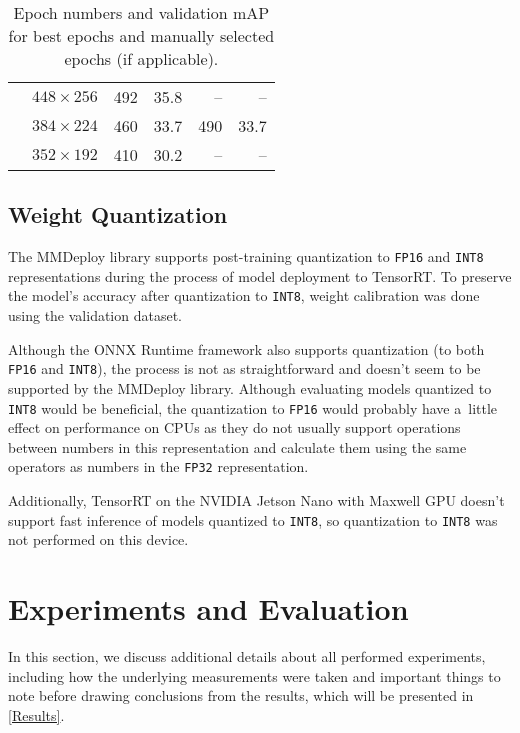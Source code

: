 \begin{table}[t]
\begin{threeparttable}
\begin{tabular}{|c|c|rr|rr|}
                                        & $448\times256$  & 492 & 35.8 &     -- & -- \\
            \cline{2-6}
                                        & $384\times224$  & 460 & 33.7 & 490 & 33.7 \\
            \cline{2-6}
                                        & $352\times192$  & 410 & 30.2 &     -- & -- \\
            \hline
        \end{tabular}
        \caption{Epoch numbers and validation mAP for best epochs and manually
        selected epochs (if applicable).}
        \label{CheckpointsUsed}
    \end{threeparttable}
    \normalsize
\end{table}


\subsection*{Weight Quantization}

The MMDeploy library supports post-training quantization to \texttt{FP16} and
\texttt{INT8} representations during the process of model deployment to
TensorRT. To preserve the model's accuracy after quantization to \texttt{INT8},
weight calibration was done using the validation dataset.

Although the ONNX Runtime framework also supports quantization (to both
\texttt{FP16} and \texttt{INT8}), the process is not as straightforward and
doesn't seem to be supported by the MMDeploy library. Although evaluating models
quantized to \texttt{INT8} would be beneficial, the quantization to
\texttt{FP16} would probably have a~little effect on performance on CPUs as they
do not usually support operations between numbers in this representation and
calculate them using the same operators as numbers in the \texttt{FP32}
representation.

Additionally, TensorRT on the NVIDIA Jetson Nano with Maxwell GPU doesn't
support fast inference of models quantized to \texttt{INT8}, so quantization to
\texttt{INT8} was not performed on this device.



\section{Experiments and Evaluation}

In this section, we discuss additional details about all performed experiments,
including how the underlying measurements were taken and important things to
note before drawing conclusions from the results, which will be presented in
\autoref{Results}.

